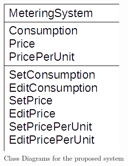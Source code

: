 \begin{figure}[H]
    \includegraphics[width=\textwidth]{./MeteringSystem.png}
    \caption{Class Diagrams for the proposed system} \label{fig:MeteringSystem Class Diagram}
\end{figure}

